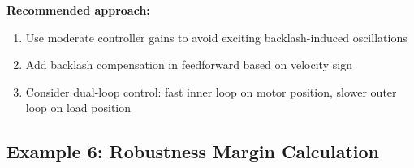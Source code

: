 \begin{example}
\textbf{Recommended approach:}
\begin{enumerate}
    \item Use moderate controller gains to avoid exciting backlash-induced oscillations
    \item Add backlash compensation in feedforward based on velocity sign
    \item Consider dual-loop control: fast inner loop on motor position, slower outer loop on load position
\end{enumerate}
\end{example}

\subsection{Example 6: Robustness Margin Calculation}

